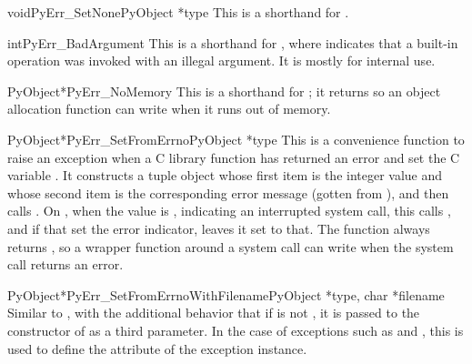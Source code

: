 \begin{cfuncdesc}{void}{PyErr_SetNone}{PyObject *type}
  This is a shorthand for .
\end{cfuncdesc}

\begin{cfuncdesc}{int}{PyErr_BadArgument}{}
  This is a shorthand for , where  indicates that a built-in
  operation was invoked with an illegal argument.  It is mostly for
  internal use.
\end{cfuncdesc}

\begin{cfuncdesc}{PyObject*}{PyErr_NoMemory}{}
  This is a shorthand for ; it
  returns \NULL{} so an object allocation function can write
   when it runs out of memory.
\end{cfuncdesc}

\begin{cfuncdesc}{PyObject*}{PyErr_SetFromErrno}{PyObject *type}
  This is a convenience function to raise an exception when a C
  library function has returned an error and set the C variable
  .  It constructs a tuple object whose first item is the
  integer  value and whose second item is the
  corresponding error message (gotten from
  ), and then calls
  .  On \UNIX, when
  the  value is , indicating an
  interrupted system call, this calls
  , and if that set the error
  indicator, leaves it set to that.  The function always returns
  \NULL, so a wrapper function around a system call can write
   when  the system call returns an
  error.
\end{cfuncdesc}

\begin{cfuncdesc}{PyObject*}{PyErr_SetFromErrnoWithFilename}{PyObject *type,
                                                             char *filename}
  Similar to , with the additional
  behavior that if  is not \NULL, it is passed to the
  constructor of  as a third parameter.  In the case of
  exceptions such as  and , this
  is used to define the  attribute of the exception
  instance.
\end{cfuncdesc}

